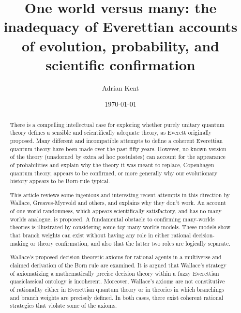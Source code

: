 \documentclass[aps,
pra,epsfig]{revtex4}
\begin{document}
\title{One world versus many: the inadequacy of Everettian accounts 
of evolution, probability, and scientific confirmation}

\author{Adrian Kent}

\date{\today}

\begin{abstract}
There is a compelling intellectual case for exploring
whether purely unitary quantum theory defines a sensible and 
scientifically adequate theory, as Everett originally proposed.
Many different and incompatible attempts to define a coherent Everettian
quantum theory have been made over the past fifty years.  
However, no known version of the theory (unadorned by extra ad hoc postulates)
can account for the appearance of probabilities and explain why the 
theory it was meant to replace, Copenhagen quantum theory, 
appears to be confirmed, or more generally why our evolutionary history 
appears to be Born-rule typical. 

This article reviews some ingenious and interesting recent attempts in 
this direction by Wallace, Greaves-Myrvold and others, and explains
why they don't work.  An account of one-world randomness, 
which appears scientifically satisfactory, and has no many-worlds
analogue, is proposed.  A fundamental obstacle to confirming many-worlds
theories is illustrated by considering some toy 
many-worlds models.  These models show that branch weights can exist without
having any role in either rational decision-making or theory confirmation,
and also that the latter two roles are logically separate. 

Wallace's proposed decision theoretic axioms for rational agents in 
a multiverse and claimed derivation of the Born rule 
are examined.  It is argued that
Wallace's strategy of axiomatizing a mathematically precise decision theory 
within a fuzzy Everettian quasiclassical ontology is incoherent.   
Moreover, Wallace's axioms 
are not constitutive of rationality either in Everettian quantum theory
or in theories in which branchings and branch weights are precisely
defined.  In both cases, there exist coherent rational strategies 
that violate some of the axioms. 
\end{abstract}
\maketitle
\end{document}
